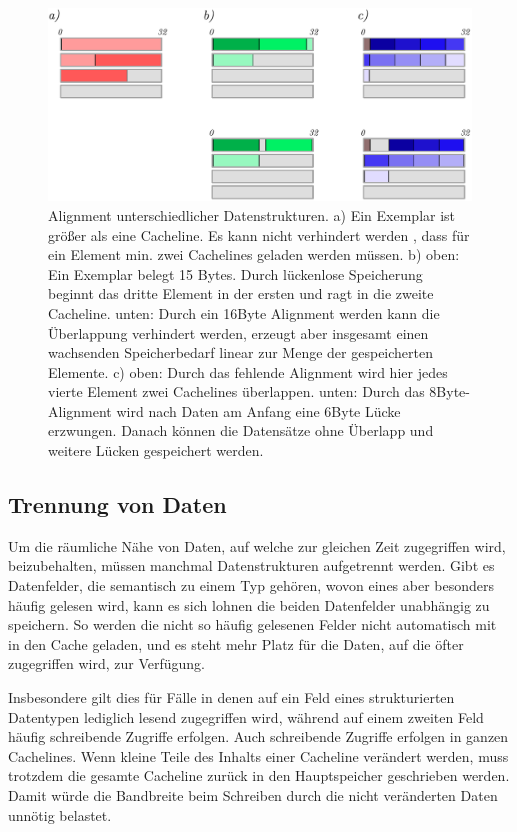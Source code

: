 \begin{figure}\centering
\includegraphics[width=1.0\textwidth]{images/cachelines.pdf} 
\caption[Alignment unterschiedlicher Datenstrukturen]{Alignment unterschiedlicher Datenstrukturen. a) Ein Exemplar ist größer als eine Cacheline. Es kann nicht verhindert werden , dass für ein Element min. zwei Cachelines geladen werden müssen. b) oben: Ein Exemplar belegt 15 Bytes. Durch lückenlose Speicherung beginnt das dritte Element in der ersten und ragt in die zweite Cacheline. unten: Durch ein 16Byte Alignment werden kann die Überlappung verhindert werden, erzeugt aber insgesamt einen wachsenden Speicherbedarf linear zur Menge der gespeicherten Elemente. c) oben: Durch das fehlende Alignment wird hier jedes vierte Element zwei Cachelines überlappen. unten: Durch das 8Byte-Alignment wird nach Daten am Anfang eine 6Byte Lücke erzwungen. Danach können die Datensätze ohne Überlapp und weitere Lücken gespeichert werden.}
\label{fig:cachelines}
\end{figure}


\subsection{Trennung von Daten}
\label{sec:seperatedata}
Um die räumliche Nähe von Daten, auf welche zur gleichen Zeit zugegriffen wird, beizubehalten, müssen manchmal Datenstrukturen aufgetrennt werden. Gibt es Datenfelder, die semantisch zu einem Typ gehören, wovon eines aber besonders häufig gelesen wird, kann es sich lohnen die beiden Datenfelder unabhängig zu speichern. So werden die nicht so häufig gelesenen Felder nicht automatisch mit in den Cache geladen, und es steht mehr Platz für die Daten, auf die öfter zugegriffen wird, zur Verfügung.

Insbesondere gilt dies für Fälle in denen auf ein Feld eines strukturierten Datentypen lediglich lesend zugegriffen wird, während auf einem zweiten Feld häufig schreibende Zugriffe erfolgen. Auch schreibende Zugriffe erfolgen in ganzen Cachelines. Wenn kleine Teile des Inhalts einer Cacheline verändert werden, muss trotzdem die gesamte Cacheline zurück in den Hauptspeicher geschrieben werden. Damit würde die Bandbreite beim Schreiben durch die nicht veränderten Daten unnötig belastet.

